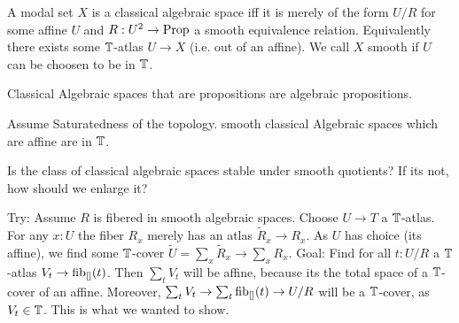 \begin{definition}
	A modal set $X$ is a classical algebraic space iff it is merely of the form $U / R$ for some affine $U$ and  $R : U^2 \to \operatorname{Prop}$ a smooth equivalence relation. Equivalently there exists some $\mathbb{T}$-atlas $U \to X$ (i.e. out of an affine). We call $X$ smooth if $U$ can be choosen to be in $\mathbb{T}$.
\end{definition}
\begin{corollary}
	Classical Algebraic spaces that are propositions are algebraic propositions.
\end{corollary}

\begin{rmk}
	Assume Saturatedness of the topology. smooth classical Algebraic spaces which are affine are in $\mathbb{T}$.
\end{rmk}
\begin{question}
Is the class of classical algebraic spaces stable under smooth quotients? If its not, how should we enlarge it?
\end{question}
Try:
Assume $R$ is fibered in smooth algebraic spaces. Choose $U \to T$ a $\mathbb{T}$-atlas. For any $x : U$ the fiber $R_x$ merely has an atlas $\tilde R_x \to R_x$. As $U$ has choice (its affine), we find some $\mathbb{T}$-cover $ \tilde U = \sum_x \tilde R_x \to \sum_x R_x$. 
Goal: Find for all $t : U / R$ a $\mathbb{T}$-atlas $V_t \to \operatorname{fib}_{[]}(t)$. Then $\sum_t V_t$ will be affine, because its the total space of a $\mathbb{T}$-cover of an affine. Moreover, $\sum_t V_t \to \sum_t \operatorname{fib}_{[]}(t) \to U/R$ will be a $\mathbb{T}$-cover, as $V_t \in \mathbb{T}$. This is what we wanted to show.


